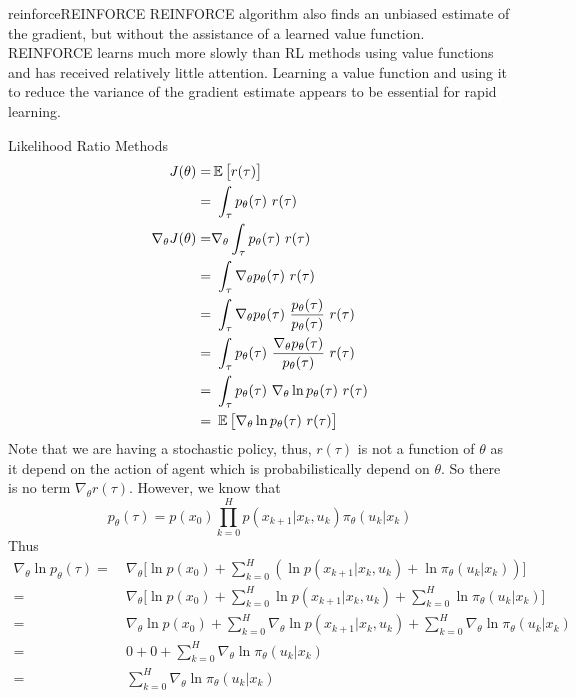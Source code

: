 \documentclass[9pt]{article}
\begin{document}
\begin{topic}{reinforce}{REINFORCE}
REINFORCE algorithm also finds an unbiased estimate of
the gradient, but without the assistance of a learned value function. REINFORCE
learns much more slowly than RL methods using value functions and has received
relatively little attention. Learning a value function and using it to reduce the variance
of the gradient estimate appears to be essential for rapid learning.

Likelihood Ratio Methods
\[
\begin{split}
	J(\theta) = & \E \big[r(\tau)\big] \\
	= &\ \int_{\tau} p_{\theta}(\tau)\ r(\tau)\\
	\nabla_{\theta} J(\theta) = & \nabla_{\theta} \int_{\tau} p_{\theta}(\tau)\ r(\tau)\\
	= &\ \int_{\tau} \nabla_{\theta} p_{\theta}(\tau)\ r(\tau)\\
	= &\ \int_{\tau} \nabla_{\theta} p_{\theta}(\tau)\ \frac{p_{\theta}(\tau)}{p_{\theta}(\tau)}\ r(\tau)\\
	= &\ \int_{\tau} p_{\theta}(\tau)\ \frac{\nabla_{\theta} p_{\theta}(\tau)}{p_{\theta}(\tau)}\ r(\tau)\\
	= &\ \int_{\tau} p_{\theta}(\tau)\ \nabla_{\theta} \ln p_{\theta}(\tau)\ r(\tau)\\
	= &\ \E \big[ \nabla_{\theta} \ln p_{\theta}(\tau)\ r(\tau) \big]
\end{split}
\]
Note that we are having a stochastic policy, thus, $r(\tau)$ is not a function of $\theta$ as it depend on the action of agent which is probabilistically depend on $\theta$. So there is no term \(\nabla_{\theta} r(\tau)\). However, we know that
\[
p_{\theta}(\tau) = p(x_0) \prod_{k=0}^{H}p(x_{k+1}|x_k,u_k)\pi_{\theta}(u_k|x_k)
\]
Thus
\[
\begin{split}
\nabla_{\theta} \ln p_{\theta}(\tau) = &\ \nabla_{\theta} \big[ \ln p(x_0) + \sum_{k=0}^{H} (\ln p(x_{k+1}|x_k,u_k) + \ln \pi_{\theta}(u_k|x_k))\big]\\
= &\ \nabla_{\theta} \big[ \ln p(x_0) + \sum_{k=0}^{H} \ln p(x_{k+1}|x_k,u_k) + \sum_{k=0}^{H} \ln \pi_{\theta}(u_k|x_k)\big]\\
= &\ \nabla_{\theta} \ln p(x_0) + \sum_{k=0}^{H} \nabla_{\theta} \ln p(x_{k+1}|x_k,u_k) + \sum_{k=0}^{H} \nabla_{\theta} \ln \pi_{\theta}(u_k|x_k)\\
= &\ 0 + 0 + \sum_{k=0}^{H} \nabla_{\theta} \ln \pi_{\theta}(u_k|x_k)\\
= &\ \sum_{k=0}^{H} \nabla_{\theta} \ln \pi_{\theta}(u_k|x_k)\\

\end{split}\]
\end{topic}
\end{document}
